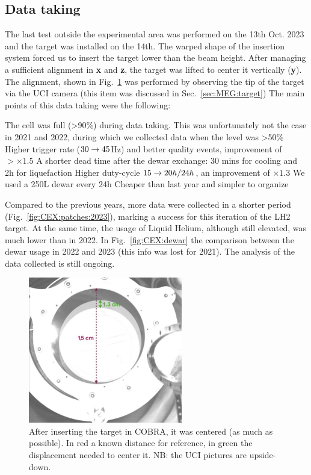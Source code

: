 \begin{refsection}
    \subsection{Data taking}
        The last test outside the experimental area was performed on the 13th Oct. 2023 and the target was installed on the 14th.
        The warped shape of the insertion system forced us to insert the target lower than the beam height. 
        After managing a sufficient alignment in \textbf{x} and \textbf{z}, the target was lifted to center it vertically (\textbf{y}). The alignment, shown in Fig.~\ref{fig:CEX:2023:allignement} was performed by observing the tip of the target via the UCI camera (this item was discussed in Sec.~\ref{sec:MEG:target})
        The main points of this data taking were the following:
        \begin{outline}
            \1 The cell was full (>90\%) during data taking. This was unfortunately not the case in 2021 and 2022, during which we collected data when the level was >50\%
            \2[->] Higher trigger rate ($30\rightarrow45$Hz) and better quality events, improvement of $>\times1.5$
            \1 A shorter dead time after the dewar exchange: 30 mins for cooling and 2h for liquefaction
            \2[->] Higher duty-cycle $15\rightarrow20h/24h$, an improvement of $\times1.3$
            \1 We used a 250L dewar every 24h
            \2[->] Cheaper than last year and simpler to organize
        \end{outline}
        Compared to the previous years, more data were collected in a shorter period (Fig.~\ref{fig:CEX:patches:2023}), marking a success for this iteration of the LH2 target. 
        At the same time, the usage of Liquid Helium, although still elevated, was much lower than in 2022. In Fig.~\ref{fig:CEX:dewar} the comparison between the dewar usage in 2022 and 2023 (this info was lost for 2021).
        The analysis of the data collected is still ongoing.

        \begin{figure}
            \centering
            \includegraphics[width=0.6\textwidth]{Figures/LH2/2023/LH2_UCI_2023.png}
            \caption[Short Caption]{After inserting the target in COBRA, it was centered (as much as possible). In red a known distance for reference, in green the displacement needed to center it. NB: the UCI pictures are upside-down.}
            \label{fig:CEX:2023:allignement}
        \end{figure}


\end{refsection}
